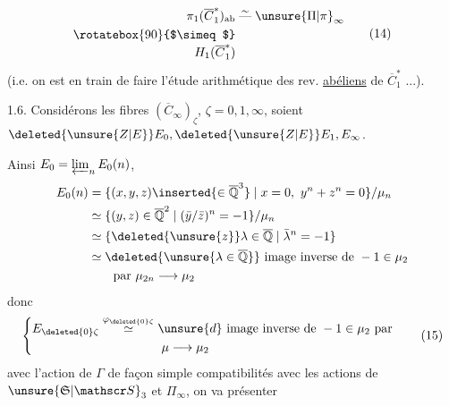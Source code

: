 \[
\begin{aligned}
\pi_1(\overline C_1^*)_{\mathrm{ab}}&\mathrel{\overset{\sim}{\text{---}}}\unsure{\Pi|\pi}_\infty\\
\rotatebox{90}{$\simeq$}&\\[-3pt]
H_1(\overline C_1^*)&
\end{aligned}\tag*{(14)}
\]
(i.e. on est en train de faire l'étude
arithmétique des rev.  \uline{abéliens} de
$\overline C_1^*$ ...).

1.6. Considérons les fibres
$(\overline C_\infty)_{\zeta}$, $\zeta=0,1,\infty$, soient
$\deleted{\unsure{Z|E}}E_0,\deleted{\unsure{Z|E}}E_1,E_\infty$.

Ainsi $E_0=\varprojlim_n E_0(n)$,
\[
\begin{aligned}
E_0(n)&=\{(x,y,z)\inserted{\in\overline{\mathbb Q}^3}\mid x=0,\ y^n+z^n=0\}/\mu_n\\
&\simeq\{(y,z)\in\overline{\mathbb Q}^2\mid(\bar y/\bar z)^n=-1\}/\mu_n\\
&\simeq\{\deleted{\unsure{z}}\lambda\in\overline{\mathbb Q}\mid\bar\lambda^n=-1\}\\
&\simeq\deleted{\unsure{\lambda\in\overline{\mathbb Q}}}\ \text{image inverse de }-1\in\mu_2\\
&\qquad\text{par }\mu_{2n}\longrightarrow\mu_2
\end{aligned}
\]
donc
\[
\left\{\begin{aligned}
E_{\deleted{0}\zeta}&\overset{\varphi_{\deleted{0}\zeta}}{\simeq}
\unsure{d}\ \text{image inverse de }-1\in\mu_2\text{ par}\\
&\hspace{5em}\mu\longrightarrow\mu_2
\end{aligned}\right.\tag*{(15)}
\]
avec l'action de  $\Gamma$ \unsure{;|,}
de façon simple  compatibilités avec
les actions de $\unsure{\mathfrak S|\mathscr S}_3$ et $\Pi_\infty$, on va présenter
